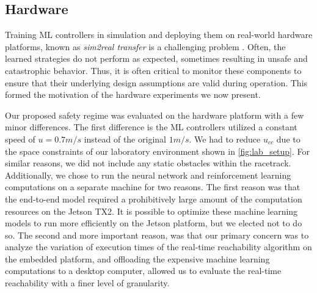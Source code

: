 \documentclass[manuscript,screen,review]{acmart}
\newcommand{\ttj}[1]{\textcolor{red}{\textbf{\underline{TTJ:}} #1}}
\begin{document}
\subsection{Hardware}
Training ML controllers in simulation and deploying them on real-world hardware platforms, known as \textit{sim2real transfer} is a challenging problem \cite{jang2019ICCPS, kadian2019we}. Often, the learned strategies do not perform as expected, sometimes resulting in unsafe and catastrophic behavior. Thus, it is often critical to monitor these components to ensure that their underlying design assumptions are valid during operation. This formed the motivation of the hardware experiments we now present.


Our proposed safety regime was  evaluated on the hardware platform with a few minor differences. The first difference is the ML controllers utilized a constant speed of $u = 0.7  m/s$ instead of the original $1  m/s$. We had to reduce $u_{cc}$ due to the space constraints of our laboratory environment shown in \ref{fig:lab_setup}. For similar reasons, we did not include any static obstacles within the racetrack. %
Additionally, we chose to run the neural network and reinforcement learning computations on a separate machine for two reasons. The first reason was that the end-to-end model required a prohibitively large amount of the computation resources on the Jetson TX2. It is possible to optimize these machine learning models to run more efficiently on the Jetson platform, but we elected not to do so. The second and more important reason, was that our primary concern was to analyze the variation of execution times of the real-time reachability algorithm on the embedded platform, and offloading the expensive machine learning computations to a desktop computer, allowed us to evaluate the real-time reachability with a finer level of granularity.
\end{document}
